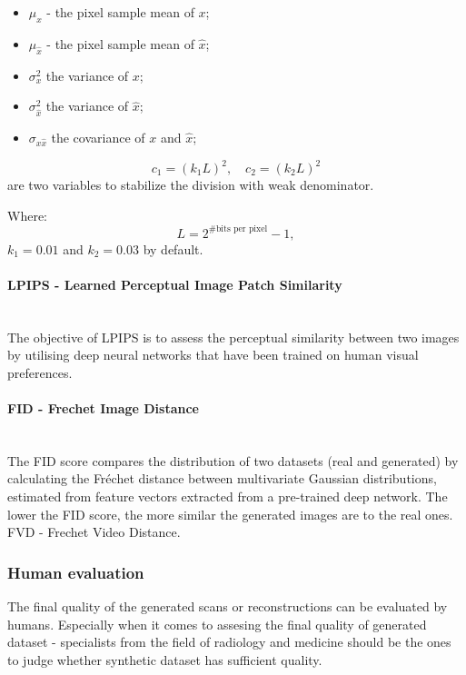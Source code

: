 \begin{itemize}
    \item $\mu_{x}$ - the pixel sample mean of $x$;  
    \item $\mu_{\hat{x}}$ - the pixel sample mean of $\hat{x}$;  
    \item $\sigma_{x}^{2}$ the variance of $x$;  
    \item $\sigma_{\hat{x}}^{2}$ the variance of $\hat{x}$;  
    \item $\sigma_{x\hat{x}}$ the covariance of $x$ and $\hat{x}$;  
\end{itemize}

\begin{equation}
c_{1} = (k_{1}L)^{2}, \quad c_{2} = (k_{2}L)^{2}
\end{equation}
are two variables to stabilize the division with weak denominator.

Where:
\begin{equation}
L = 2^{\#\text{bits per pixel}} - 1,
\end{equation}
$k_{1} = 0.01$ and $k_{2} = 0.03$ by default.

\paragraph{LPIPS - Learned Perceptual Image Patch Similarity}\mbox{}\\
\indent The objective of LPIPS is to assess the perceptual similarity between two images by utilising deep neural networks that have been trained on human visual preferences.

\paragraph{FID - Frechet Image Distance}\mbox{}\\
\indent The FID score compares the distribution of two datasets (real and generated) by calculating the Fréchet distance between multivariate Gaussian distributions, estimated from feature vectors extracted from a pre-trained deep network. The lower the FID score, the more similar the generated images are to the real ones. FVD - Frechet Video Distance.

\subsubsection{Human evaluation}
The final quality of the generated scans or reconstructions can be evaluated by humans. Especially when it comes to assesing the final quality of generated dataset - specialists from the field of radiology and medicine should be the ones to judge whether synthetic dataset has sufficient quality. 